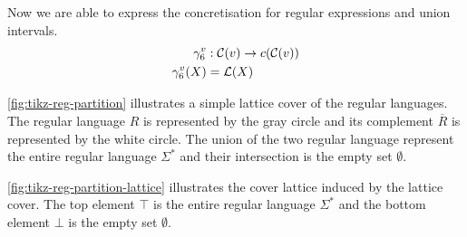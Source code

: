 Now we are able to express the concretisation for regular expressions and union intervals.
\begin{align}
    \gamma^v_6 &: \mathcal{C}(v) \rightarrow c(\mathcal{C}(v)) \\
    \gamma^v_6(X) &= \mathcal{L}(X)
\end{align}

%


\begin{example}
    \autoref{fig:tikz-reg-partition} illustrates a simple lattice cover of the regular languages.
    The regular language $R$ is represented by the gray circle and its complement $\overline{R}$ is represented by the white circle.
    The union of the two regular language represent the entire regular language $\Sigma^*$ and their intersection is the empty set $\emptyset$.

    \autoref{fig:tikz-reg-partition-lattice} illustrates the cover lattice induced by the lattice cover.
    The top element $\top$ is the entire regular language $\Sigma^*$ and the bottom element $\bot$ is the empty set $\emptyset$.
\end{example}

